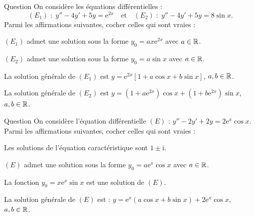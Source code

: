 \begin{multi}[multiple,feedback=
{Les solutions de l'équation caractéristique sont \(2\pm \mathrm{i}\). Donc \((E_1)\) admet une solution particulière sous la forme \(\displaystyle y_0=a\mathrm{e}^{2x}\) et \((E_2)\) admet une solution particulière sous la forme \(\displaystyle y_0=a\cos x+b\sin x\). Les calculs montrent que la solution générale de \((E_1)\) est \(\displaystyle y=\mathrm{e}^{2x}\left[1+a\cos x+b\sin x\right]\), \(a,b\in \Rr\), et la solution générale de \((E_2)\) est : 
\[y=\left(1+a\mathrm{e}^{2x}\right)\cos x+\left(1+b\mathrm{e}^{2x}\right)\sin x,\; a,b\in \Rr.\]
}]{Question}
On considère les équations différentielles :
\[(E_1)\; :\; y''-4y'+5y=\mathrm{e}^{2x}\quad \mbox{et}\quad (E_2)\; :\; y''-4y'+5y=8\sin x.\]
Parmi les affirmations suivantes, cocher celles qui sont vraies :

    \item \((E_1)\) admet une solution sous la forme \(\displaystyle y_0=ax\mathrm{e}^{2x}\) avec \(a\in \mathbb{R}\).
    \item \((E_2)\) admet une solution sous la forme \(\displaystyle y_0=a\sin x\) avec \(a\in \mathbb{R}\).
    \item* La solution générale de \((E_1)\) est \(\displaystyle y=\mathrm{e}^{2x}\left[1+a\cos x+b\sin x\right]\), \(a,b\in \Rr\).
    \item* La solution générale de \((E_2)\) est \(\displaystyle y=\left(1+a\mathrm{e}^{2x}\right)\cos x+\left(1+b\mathrm{e}^{2x}\right)\sin x\), \(a,b\in \Rr\).
\end{multi}


\begin{multi}[multiple,feedback=
{La solution générale de l'équation homogène est \(Y=\mathrm{e}^{x}\left(a\cos x+b\sin x\right)\), \(a\) et \(b\in\Rr\), et \(\displaystyle y_0=x\mathrm{e}^{x}\sin x\) est une solution particulière de \((E)\). Donc la solution générale de \((E)\) est : \(\displaystyle y=Y+y_0=\mathrm{e}^{x}\left(a\cos x+b\sin x\right)+x\mathrm{e}^{x}\sin x\), \(a,b\in \Rr\).
}]{Question}
On considère l'équation différentielle \((E)\) : \(y''-2y'+2y=2\mathrm{e}^{x}\cos x\). Parmi les affirmations suivantes, cocher celles qui sont vraies :

    \item* Les solutions de l'équation caractéristique sont \(1\pm \mathrm{i}\).
    \item \((E)\) admet une solution sous la forme \(\displaystyle y_0=a\mathrm{e}^{x}\cos x\) avec \(a\in \mathbb{R}\).
    \item* La fonction \(\displaystyle y_0=x\mathrm{e}^{x}\sin x\) est une solution de \((E)\).
    \item La solution générale de \((E)\) est : \(\displaystyle y=\mathrm{e}^{x}\left(a\cos x+b\sin x\right)+2\mathrm{e}^{x}\cos x\), \(a,b\in \Rr\).
\end{multi}


